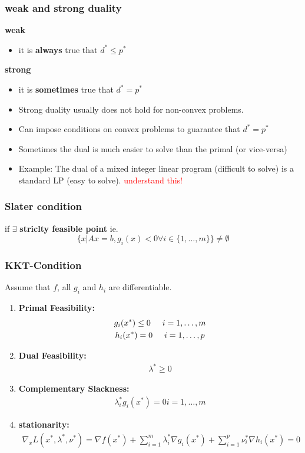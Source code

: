 \subsubsection{weak and strong duality}
\textbf{weak}
\begin{itemize}
    \item it is \textbf{always} true that $d^*\leq p^*$
\end{itemize}
\textbf{strong}
\begin{itemize}
    \item it is \textbf{sometimes} true that $d^* = p^*$
    \item Strong duality usually does not hold for non-convex problems.
    \item Can impose conditions on convex problems to guarantee that $d^*= p^*$
    \item Sometimes the dual is much easier to solve than the primal (or vice-versa)
    \item Example: The dual of a mixed integer linear program (difficult to solve) is
a standard LP (easy to solve).
\textcolor{red}{understand this!}
\end{itemize}
\subsubsection{Slater condition}
if $\exists$ \textbf{striclty feasible point} ie.\[ \{ x|Ax= b, g_i(x) < 0 \forall i \in \{1,\dots,m\}\}\neq \emptyset\]
\subsubsection{KKT-Condition}
Assume that $f$, all $g_i$ and $h_i$ are differentiable.
\begin{enumerate}
    \item \textbf{Primal Feasibility:} \begin{gather*}
        g_i(x^*)\leq 0 \hspace{5mm} i = 1,\dots , m\\
        h_i(x^*) = 0 \hspace{5mm} i = 1,\dots, p
    \end{gather*}
    \item \textbf{Dual Feasibility:}
    \begin{gather*}
        \lambda^* \geq 0
    \end{gather*}
    \item\textbf{Complementary Slackness:}
    \begin{gather*}
        \lambda^*_ig_i(x^*) = 0 i = 1,\dots , m 
    \end{gather*}
    \item \textbf{stationarity:}
    \begin{gather*}
        \nabla_xL(x^*, \lambda^*, \nu^*) = \nabla f(x^*) + \sum ^m_{i=1} \lambda_i^*\nabla g_i(x^*)+ \sum^p_{i=1} \nu_i^*\nabla h_i (x^*) = 0
    \end{gather*}
\end{enumerate}
